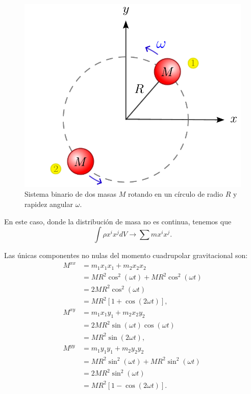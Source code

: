 \documentclass[letterpaper,11pt]{article}
\begin{document}
\begin{figure}
     \centering
     \includegraphics[scale = 0.58]{Ejemplo-Emision-GW}
     \caption{Sistema binario de dos masas $M$ rotando en un círculo de radio $R$ y rapidez angular $\omega$.}
     \label{fig:Example-emision-GW}
\end{figure}

En este caso, donde la distribución de masa no es continua, tenemos que
\begin{equation}
\int \rho x^{i} x^{j} dV \rightarrow \sum m x^{i} x^{j}.
\end{equation}

Las únicas componentes no nulas del momento cuadrupolar gravitacional son:
\begingroup
\allowdisplaybreaks
\begin{align}
M^{xx} &= m_1 x_1x_1 + m_2 x_2 x_2 \nonumber \\
&= M R^2 \cos^2(\omega t) + M R^2 \cos^2(\omega t) \nonumber \\
&= 2 M R^2 \cos^2(\omega t) \nonumber \\
&= M R^2 \left[ 1 + \cos(2\omega t)\right], \\
M^{xy} &= m_1 x_1y_1 + m_2 x_2 y_2 \nonumber \\
&= 2M R^2 \sin(\omega t) \cos(\omega t) \nonumber \\
&= MR^2 \sin(2\omega t), \\
M^{yy} &=  m_1 y_1y_1 + m_2 y_2 y_2 \nonumber \\
&= M R^2 \sin^2(\omega t) + M R^2 \sin^2(\omega t) \nonumber \\
&= 2M R^2 \sin^2(\omega t) \nonumber \\
&= MR^2 \left[1 - \cos(2\omega t) \right]. 
\end{align}
\endgroup
\end{document}
